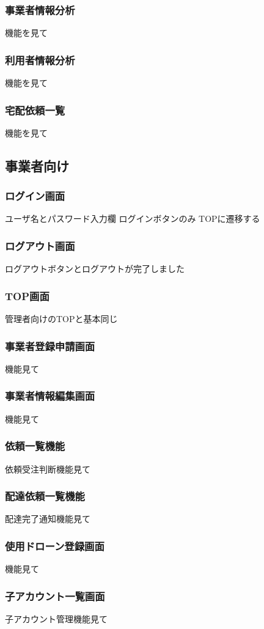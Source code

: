\documentclass[a4paper, titlepage]{jsarticle}
\begin{document}
\subsubsection{事業者情報分析}
機能を見て
\subsubsection{利用者情報分析}
機能を見て
\subsubsection{宅配依頼一覧}
機能を見て

\subsection{事業者向け}
\subsubsection{ログイン画面}
ユーザ名とパスワード入力欄
ログインボタンのみ
TOPに遷移する
\subsubsection{ログアウト画面}
ログアウトボタンとログアウトが完了しました
\subsubsection{TOP画面}
管理者向けのTOPと基本同じ
\subsubsection{事業者登録申請画面}
機能見て
\subsubsection{事業者情報編集画面}
機能見て
\subsubsection{依頼一覧機能}
依頼受注判断機能見て
\subsubsection{配達依頼一覧機能}
配達完了通知機能見て
\subsubsection{使用ドローン登録画面}
機能見て
\subsubsection{子アカウント一覧画面}
子アカウント管理機能見て
\end{document}
